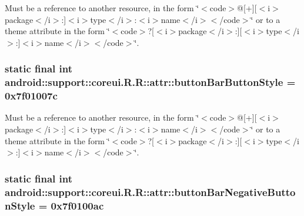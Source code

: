 Must be a reference to another resource, in the form \char`\"{}$<$code$>$@\mbox{[}+\mbox{]}\mbox{[}$<$i$>$package$<$/i$>$:\mbox{]}$<$i$>$type$<$/i$>$:$<$i$>$name$<$/i$>$$<$/code$>$\char`\"{} or to a theme attribute in the form \char`\"{}$<$code$>$?\mbox{[}$<$i$>$package$<$/i$>$:\mbox{]}\mbox{[}$<$i$>$type$<$/i$>$:\mbox{]}$<$i$>$name$<$/i$>$$<$/code$>$\char`\"{}. \hypertarget{classandroid_1_1support_1_1coreui_1_1_r_1_1attr_ba307ae51d7555f94396dfe251da5fbf}{
\subsubsection[{buttonBarButtonStyle}]{\setlength{\rightskip}{0pt plus 5cm}static final int android::support::coreui.R.R::attr::buttonBarButtonStyle = 0x7f01007c}}
\label{classandroid_1_1support_1_1coreui_1_1_r_1_1attr_ba307ae51d7555f94396dfe251da5fbf}


Must be a reference to another resource, in the form \char`\"{}$<$code$>$@\mbox{[}+\mbox{]}\mbox{[}$<$i$>$package$<$/i$>$:\mbox{]}$<$i$>$type$<$/i$>$:$<$i$>$name$<$/i$>$$<$/code$>$\char`\"{} or to a theme attribute in the form \char`\"{}$<$code$>$?\mbox{[}$<$i$>$package$<$/i$>$:\mbox{]}\mbox{[}$<$i$>$type$<$/i$>$:\mbox{]}$<$i$>$name$<$/i$>$$<$/code$>$\char`\"{}. \hypertarget{classandroid_1_1support_1_1coreui_1_1_r_1_1attr_4f35348dafbcff130b7020470f415035}{
\subsubsection[{buttonBarNegativeButtonStyle}]{\setlength{\rightskip}{0pt plus 5cm}static final int android::support::coreui.R.R::attr::buttonBarNegativeButtonStyle = 0x7f0100ac}}
\label{classandroid_1_1support_1_1coreui_1_1_r_1_1attr_4f35348dafbcff130b7020470f415035}


